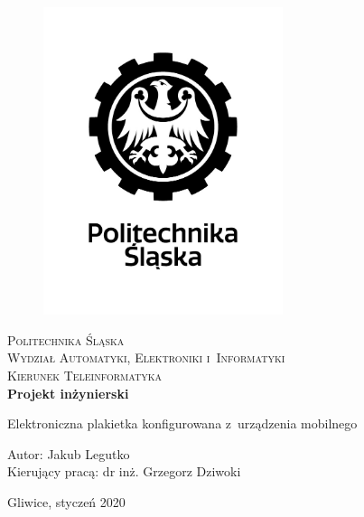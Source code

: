 \documentclass[a4paper,12pt, twoside]{article}
\begin{document}
    	\newpage
    	\thispagestyle{empty}
    	\begin{center}
    		
    		\begin{figure}
    			\centering
    			\includegraphics[width=7cm]{images/polsl_logo.jpg}
    			\vspace{.5cm}
    		\end{figure}
    		
    		{\fontsize{17}{17}\selectfont
    			\textsc{Politechnika Śląska \\[.3cm]
    				Wydział Automatyki, Elektroniki i~Informatyki  \\[.3cm]
    				Kierunek Teleinformatyka  \\[1.5cm]}
    			\textbf{Projekt inżynierski \\[0.7cm]}}
    		
    		\Large
    		{Elektroniczna plakietka konfigurowana z~urządzenia mobilnego \\[3.5cm]}
    		\Large{\begin{flushleft}
    				Autor: Jakub Legutko\\
    				Kierujący pracą: dr inż. Grzegorz Dziwoki\\[0.3cm]
    		\end{flushleft}}
    		
    		\normalsize
    		\vfill Gliwice, styczeń 2020
    	\end{center}
    	\newpage
    	\newpage
    	\thispagestyle{empty}
    	\tableofcontents
    	\newpage
    	\newpage
    	\clearpage
    	\setcounter{page}{1}
    	
\end{document}

